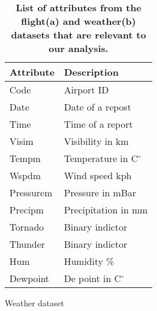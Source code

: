 \begin{table*}[!htb]
  \begin{subtable}{.5\linewidth}
    \centering
    \begin{tabular}[t]{|l|l|}
      \hline
      \bf{Attribute} & \bf{Description}           \\ \hline
      Code           & Airport ID                 \\ \hline
      Date	         & Date of a repost           \\ \hline
      Time           & Time of a report           \\ \hline
      Visim          & Visibility in km           \\ \hline
      Tempm          & Temperature in C$^{\circ}$ \\ \hline
      Wspdm          & Wind speed kph             \\ \hline
      Pressurem      & Pressure in mBar           \\ \hline
      Precipm        & Precipitation in mm        \\ \hline
      Tornado        & Binary indictor            \\ \hline
      Thunder        & Binary indictor            \\ \hline
      Hum            & Humidity \%                \\ \hline
      Dewpoint & De point in  C$^{\circ}$ \\ \hline
    \end{tabular}
    \caption{Weather dataset}
  \end{subtable}
\vspace{-0.1cm}   \caption{\bf{List of attributes from the flight(a) and weather(b)  datasets that are relevant to our analysis.}}
\label{tab:attlist}
\end{table*}
\vspace{-0.1cm}




